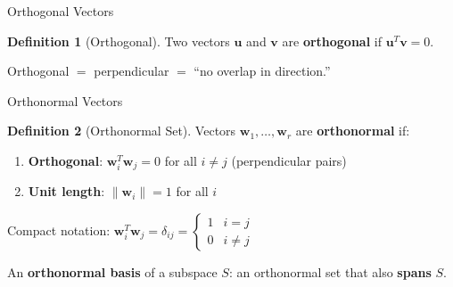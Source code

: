 \documentclass[10pt]{beamer}
\theoremstyle{definition}
\newtheorem{defi}{Definition}[section]
\newcommand{\x}[1]{\alert{\textbf{#1}}}
\begin{document}
\begin{frame}{Orthogonal Vectors}

\begin{defi}[Orthogonal]
Two vectors $\mathbf{u}$ and $\mathbf{v}$ are \x{orthogonal} if $\mathbf{u}^T \mathbf{v} = 0$.
\end{defi}

\vspace{0.3em}

\begin{center}
\end{center}

\vspace{0.3em}

Orthogonal $=$ perpendicular $=$ ``no overlap in direction.''

\end{frame}

\begin{frame}{Orthonormal Vectors}

\begin{defi}[Orthonormal Set]
Vectors $\mathbf{w}_1, \ldots, \mathbf{w}_r$ are \x{orthonormal} if:
\begin{enumerate}
\item \x{Orthogonal}: $\mathbf{w}_i^T \mathbf{w}_j = 0$ for all $i \neq j$ \quad (perpendicular pairs)
\item \x{Unit length}: $\|\mathbf{w}_i\| = 1$ for all $i$
\end{enumerate}
\end{defi}

\vspace{0.3em}

Compact notation: $\mathbf{w}_i^T \mathbf{w}_j = \delta_{ij} = \begin{cases} 1 & i = j \\ 0 & i \neq j \end{cases}$

\vspace{0.5em}

An \x{orthonormal basis} of a subspace $S$: an orthonormal set that also \x{spans} $S$.

\end{frame}
\end{document}
